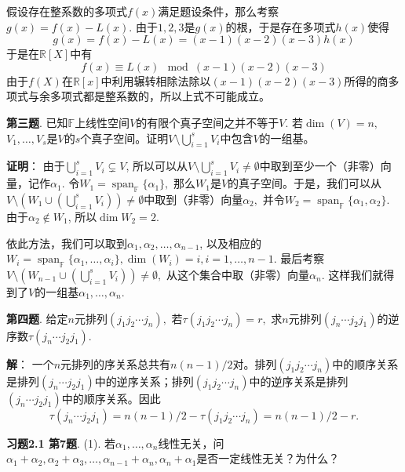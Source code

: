 假设存在整系数的多项式$f(x)$满足题设条件，那么考察$g(x) = f(x) - L(x).$ 由于$1, 2, 3$是$g(x)$的根，于是存在多项式$h(x)$使得
$$g(x) = f(x) - L(x) = (x-1)(x-2)(x-3) h(x)$$
于是在$\mathbb{R}[X]$中有
$$f(x) \equiv L(x) \mod (x-1)(x-2)(x-3)$$
由于$f(X)$在$\mathbb{R}[x]$中利用辗转相除法除以$(x-1)(x-2)(x-3)$所得的商多项式与余多项式都是整系数的，所以上式不可能成立。

\newpageorvspace

{\bf 第三题}. 已知$\mathbb{F}$上线性空间$V$的有限个真子空间之并不等于$V.$ 若$\dim(V) = n,$ $V_1, \ldots, V_s$是$V$的$s$个真子空间。证明$\displaystyle V \setminus \bigcup_{i=1}^s V_i$中包含$V$的一组基。

\newpageorvspace

{\bf 证明}： 由于$\displaystyle \bigcup_{i=1}^s V_i \subsetneq V$, 所以可以从$V \setminus \bigcup_{i=1}^s V_i \neq \emptyset$中取到至少一个（非零）向量，记作$\alpha_1.$ 令$W_1 = \operatorname{span}_{\mathbb{F}}\{\alpha_1\},$ 那么$W_1$是$V$的真子空间。于是，我们可以从$V \setminus \left( W_1 \cup \left( \bigcup_{i=1}^s V_i \right) \right) \neq \emptyset$中取到（非零）向量$\alpha_2,$ 并令$W_2 = \operatorname{span}_{\mathbb{F}}\{\alpha_1, \alpha_2\}$. 由于$\alpha_2 \not\in W_1$, 所以$\dim W_2 = 2$.

依此方法，我们可以取到$\alpha_1, \alpha_2, \ldots, \alpha_{n-1}$, 以及相应的$W_i = \operatorname{span}_{\mathbb{F}}\{\alpha_1, \ldots, \alpha_i\}, \dim (W_i) = i, i=1, \ldots, n-1$. 最后考察$V \setminus \left( W_{n-1} \cup \left( \bigcup_{i=1}^s V_i \right) \right) \neq \emptyset,$ 从这个集合中取（非零）向量$\alpha_n$. 这样我们就得到了$V$的一组基$\alpha_1, \ldots, \alpha_n.$

\newpageorvspace

{\bf 第四题}. 给定$n$元排列$(j_1j_2\cdots j_n),$ 若$\tau(j_1j_2\cdots j_n) = r,$ 求$n$元排列$(j_n\cdots j_2j_1)$的逆序数$\tau(j_n\cdots j_2j_1)$.

\newpageorvspace

{\bf 解}： 一个$n$元排列的序关系总共有$n(n-1)/2$对。排列$(j_1j_2\cdots j_n)$中的顺序关系是排列$(j_n\cdots j_2j_1)$中的逆序关系；排列$(j_1j_2\cdots j_n)$中的逆序关系是排列$(j_n\cdots j_2j_1)$中的顺序关系。因此
$$\tau(j_n\cdots j_2j_1) = n(n-1)/2 - \tau(j_1j_2\cdots j_n) = n(n-1)/2 - r.$$

\newpageorvspace

{\bf 习题2.1 第7题}. (1). 若$\alpha_1, \ldots, \alpha_n$线性无关，问$\alpha_1 + \alpha_2, \alpha_2 + \alpha_3, \ldots, \alpha_{n-1} + \alpha_n, \alpha_n + \alpha_1$是否一定线性无关？为什么？

